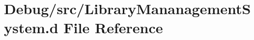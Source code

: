 \hypertarget{_library_mananagement_system_8d}{}\section{Debug/src/\+Library\+Mananagement\+System.d File Reference}
\label{_library_mananagement_system_8d}
